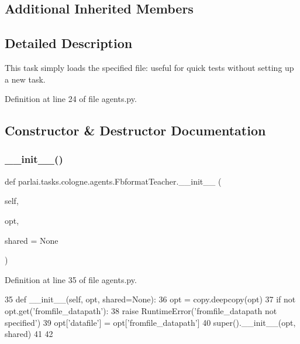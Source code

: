 \subsection*{Additional Inherited Members}


\subsection{Detailed Description}
\begin{DoxyVerb}This task simply loads the specified file: useful for quick tests without setting up
a new task.
\end{DoxyVerb}
 

Definition at line 24 of file agents.\+py.



\subsection{Constructor \& Destructor Documentation}
\mbox{\label{classparlai_1_1tasks_1_1cologne_1_1agents_1_1FbformatTeacher_aa8a25bb85c92156bbd9c4c94c93a852d}} 
\subsubsection{\texorpdfstring{\+\_\+\+\_\+init\+\_\+\+\_\+()}{\_\_init\_\_()}}
{\footnotesize\ttfamily def parlai.\+tasks.\+cologne.\+agents.\+Fbformat\+Teacher.\+\_\+\+\_\+init\+\_\+\+\_\+ (\begin{DoxyParamCaption}\item[{}]{self,  }\item[{}]{opt,  }\item[{}]{shared = {\ttfamily None} }\end{DoxyParamCaption})}



Definition at line 35 of file agents.\+py.


\begin{DoxyCode}
35     \textcolor{keyword}{def }\_\_init\_\_(self, opt, shared=None):
36         opt = copy.deepcopy(opt)
37         \textcolor{keywordflow}{if} \textcolor{keywordflow}{not} opt.get(\textcolor{stringliteral}{'fromfile\_datapath'}):
38             \textcolor{keywordflow}{raise} RuntimeError(\textcolor{stringliteral}{'fromfile\_datapath not specified'})
39         opt[\textcolor{stringliteral}{'datafile'}] = opt[\textcolor{stringliteral}{'fromfile\_datapath'}]
40         super().\_\_init\_\_(opt, shared)
41 
42 
\end{DoxyCode}


